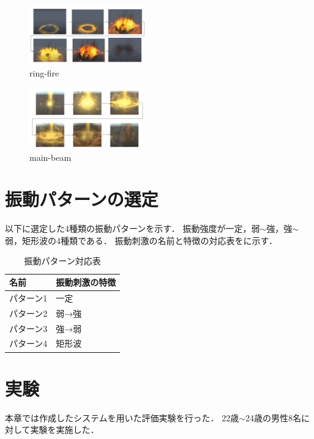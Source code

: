 \documentclass[uplatex]{jsarticle}   %
\begin{document}
\begin{figure}[h]
\centering
\includegraphics[clip,width=5cm]{fig/ringfireTime.png}
\caption{ring-fire}\label{ringfire}
\end{figure}

\begin{figure}[h]
    \centering
\includegraphics[clip,width=5cm]{fig/mainbeamTime.png}
    \caption{main-beam}\label{explosion}
    \end{figure}

    \section{振動パターンの選定}
以下に選定した4種類の振動パターンを示す．
振動強度が一定，弱$\sim$強，強$\sim$弱，矩形波の4種類である．
振動刺激の名前と特徴の対応表をに示す．

\begin{table}[H]
    \caption{振動パターン対応表}
    \centering
    \begin{tabular}{l|l}
    \hline
    \hline
    名前 & 振動刺激の特徴 \\
    \hline
    パターン1 & 一定 \\
    パターン2 & 弱→強 \\
    パターン3 & 強→弱 \\
    パターン4 & 矩形波 \\
    \hline
    \end{tabular}
    \label{tab;sindou}
\end{table}


\section{実験}
本章では作成したシステムを用いた評価実験を行った．
22歳$\sim$24歳の男性8名に対して実験を実施した．
\end{document}
